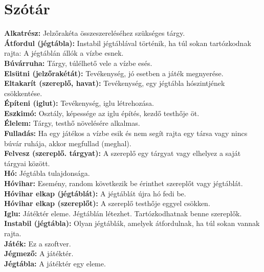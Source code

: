 \section{Szótár}

\textbf{Alkatrész:} Jelzőrakéta összeszereléséhez szükséges tárgy. \\
\textbf{Átfordul (jégtábla):} Instabil jégtáblával történik, ha túl sokan  tartózkodnak rajta: A jégtáblán állók a vízbe esnek. \\
\textbf{Búvárruha:} Tárgy, túlélhető vele a vízbe esés. \\
\textbf{Elsütni (jelzőrakétát):} Tevékenység, jó esetben a játék megnyerése. \\
\textbf{Eltakarít (szereplő, havat):} Tevékenység, egy jégtábla hószintjének csökkentése. \\
\textbf{Építeni (iglut):} Tevékenység, iglu létrehozása. \\
\textbf{Eszkimó:} Osztály, képessége az iglu építés, kezdő testhője öt. \\
\textbf{Élelem:} Tárgy, testhő növelésére alkalmas. \\
\textbf{Fulladás:} Ha egy játékos a vízbe esik és nem segít rajta egy társa vagy nincs búvár ruhája, akkor megfullad (meghal). \\
\textbf{Felvesz (szereplő. tárgyat):} A szereplő egy tárgyat vagy elhelyez a saját tárgyai között. \\
\textbf{Hó:} Jégtábla tulajdonsága. \\
\textbf{Hóvihar:} Esemény, random következik be érinthet szereplőt vagy jégtáblát. \\
\textbf{Hóvihar elkap (jégtáblát):} A jégtáblát újra hó fedi be. \\
\textbf{Hóvihar elkap (szereplőt):} A szereplő testhője eggyel csökken. \\
\textbf{Iglu:} Játéktér eleme. Jégtáblán létezhet. Tartózkodhatnak benne szereplők. \\
\textbf{Instabil (jégtábla):} Olyan jégtáblák, amelyek átfordulnak, ha túl sokan vannak rajta. \\
\textbf{Játék:} Ez a szoftver. \\
\textbf{Jégmező:} A játéktér. \\
\textbf{Jégtábla:} A játéktér egy eleme. \\

